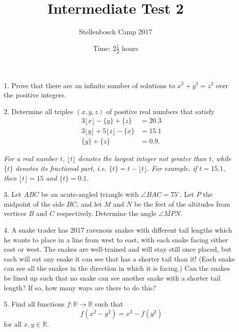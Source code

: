 \documentclass[12pt]{article}
\title{Intermediate Test 2}
\author{Stellenbosch Camp 2017}
\date{Time: $2\frac{1}{2}$ hours}
\begin{document}
 \maketitle

\begin{enumerate}

\item[1.]  %
Prove that there are an infinite number of solutions to $x^3 + y^3 = z^2$ over the positive integers.

\item[2.] %
Determine all triples $(x,y,z)$ of positive real numbers that satisfy
\begin{align*}
	3\lfloor{x}\rfloor -\{y\} +\{z\} &= 20.3 \\
	3\lfloor{y}\rfloor +5\lfloor{z}\rfloor -\{x\} &= 15.1 \\
	\{y\} +\{z\} &= 0.9.
\end{align*}

\emph{For a real number $t$, $\lfloor{t}\rfloor$ denotes the largest integer not greater than $t$, while $\{t\}$ denotes its fractional part, i.e. $\{t\} = t -\lfloor{t}\rfloor$. For example, if $t = 15.1$, then $\lfloor{t}\rfloor = 15$ and $\{t\} = 0.1$.}

\item[3.] %
Let $ABC$ be an acute-angled triangle with $\angle BAC = 75^\circ$. Let $P$ the midpoint of the side $BC$, and let $M$ and $N$ be the feet of the altitudes from vertices $B$ and $C$ respectively. Determine the angle $\angle MPN$.

\item[4.] %
A snake trader has 2017 ravenous snakes with different tail lengths which he wants to place in a line from west to east, with each snake facing either east or west. The snakes are well-trained and will stay still once placed, but each will eat any snake it can see that has a shorter tail than it! (Each snake can see all the snakes in the direction in which it is facing.) Can the snakes be lined up such that no snake can see another snake with a shorter tail length? If so, how many ways are there to do this?

\item[5.]
Find all functions $f : \mathbb{R} \to \mathbb{R}$ such that
	\[f(x^2-y^2) = x^2 - f(y^2)\]
for all $x,y \in \mathbb{R}$.

\end{enumerate}
\end{document}
